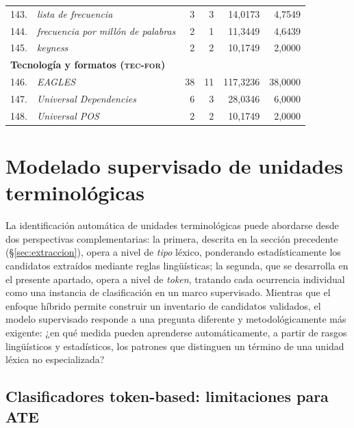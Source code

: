 \begin{longtable}{@{} r p{5cm} r r r r @{}}
143. & \textit{lista de frecuencia} & 3 & 3 & 14{,}0173 & 4{,}7549 \\
144. & \textit{frecuencia por millón de palabras} & 2 & 1 & 11{,}3449 & 4{,}6439 \\
145. & \textit{keyness} & 2 & 2 & 10{,}1749 & 2{,}0000 \\
\midrule
\multicolumn{6}{l}{\textbf{Tecnología y formatos (\textsc{tec-for})}} \\
\midrule
146. & \textit{EAGLES} & 38 & 11 & 117{,}3236 & 38{,}0000 \\
147. & \textit{Universal Dependencies} & 6 & 3 & 28{,}0346 & 6{,}0000 \\
148. & \textit{Universal POS} & 2 & 2 & 10{,}1749 & 2{,}0000 \\
\end{longtable}
\normalsize


\section{Modelado supervisado de unidades terminológicas}
\label{sec:modelo_tc}

La identificación automática de unidades terminológicas puede abordarse desde dos perspectivas complementarias: la primera, descrita en la sección precedente (§\ref{sec:extraccion}), opera a nivel de \emph{tipo} léxico, ponderando estadísticamente los candidatos extraídos mediante reglas lingüísticas; la segunda, que se desarrolla en el presente apartado, opera a nivel de \emph{token}, tratando cada ocurrencia individual como una instancia de clasificación en un marco supervisado. Mientras que el enfoque híbrido permite construir un inventario de candidatos validados, el modelo supervisado responde a una pregunta diferente y metodológicamente más exigente: ¿en qué medida pueden aprenderse automáticamente, a partir de rasgos lingüísticos y estadísticos, los patrones que distinguen un término de una unidad léxica no especializada?

\subsection{Clasificadores token-based: limitaciones para ATE}
\label{subsec:clasificadores_tokenbase}

